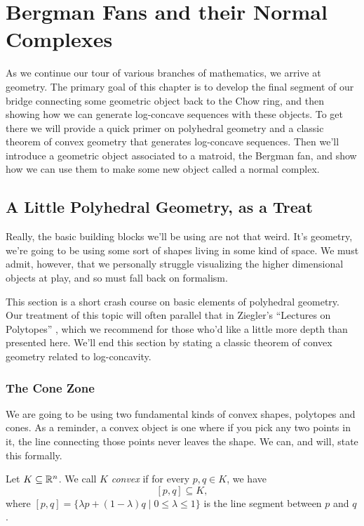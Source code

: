 \documentclass[12pt,oneside]{../../sfsuthesis}
\begin{document}
\chapter{Bergman Fans and their Normal Complexes}
As we continue our tour of various branches of mathematics, we arrive at geometry.
The primary goal of this chapter is to develop the final segment of our bridge connecting some geometric object back to the Chow ring, and then showing how we can generate log-concave sequences with these objects.
To get there we will provide a quick primer on polyhedral geometry and a classic theorem of convex geometry that generates log-concave sequences.
Then we'll introduce a geometric object associated to a matroid, the Bergman fan, and show how we can use them to make some new object called a normal complex.

\section{A Little Polyhedral Geometry, as a Treat}
Really, the basic building blocks we'll be using are not that weird.
It's geometry, we're going to be using some sort of shapes living in some kind of space.
We must admit, however, that we personally struggle visualizing the higher dimensional objects at play, and so must fall back on formalism.

This section is a short crash course on basic elements of polyhedral geometry.
Our treatment of this topic will often parallel that in Ziegler's ``Lectures on Polytopes'' \cite{zieglerLecturesPolytopes1995}, which we recommend for those who'd like a little more depth than presented here.
We'll end this section by stating a classic theorem of convex geometry related to log-concavity.

\subsection{The Cone Zone}
We are going to be using two fundamental kinds of convex shapes, polytopes and cones.
As a reminder, a convex object is one where if you pick any two points in it, the line connecting those points never leaves the shape.
We can, and will, state this formally.
\begin{definition}[Convexity]\label{def:convex}
    Let \( K \subseteq \mathbb{R}^n \).
    We call \( K \) \emph{convex} if for every \( p, q \in K \), we have
    \[
        [p, q] \subseteq K,
    \]
    where \( [p, q] = \{ \lambda p + (1 - \lambda) q \; | \; 0 \leq \lambda \leq 1 \} \) is the line segment between \( p \) and \( q \).
\end{definition}
\end{document}
